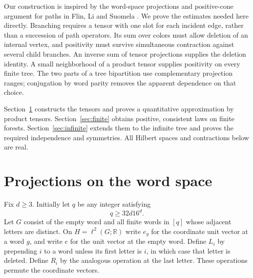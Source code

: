 \documentclass[11pt]{amsart}
\newcommand{\R}{\mathbb R}
\begin{document}
Our construction is inspired by the word-space projections and positive-cone
argument for paths in Flin, Li and Suomela \cite[Section 4.1 and Appendix B]{FLS}.
We prove the estimates needed here directly. Branching requires a tensor with
one slot for each incident edge, rather than a succession of path operators.
Its sum over colors must allow deletion of an internal vertex, and positivity
must survive simultaneous contraction against several child branches. An
inverse sum of tensor projections supplies the deletion identity. A small
neighborhood of a product tensor supplies positivity on every finite tree.
The two parts of a tree bipartition use complementary projection ranges;
conjugation by word parity removes the apparent dependence on that choice.

Section~\ref{sec:projections} constructs the tensors and proves a quantitative
approximation by product tensors. Section~\ref{sec:finite} obtains positive,
consistent laws on finite forests. Section~\ref{sec:infinite} extends them to
the infinite tree and proves the required independence and symmetries.
All Hilbert spaces and contractions below are real.

\section{Projections on the word space}\label{sec:projections}

Fix $d\geq3$. Initially let $q$ be any integer satisfying
\begin{equation}\label{eq:invertibilityrange}
q\geq32d16^d.
\end{equation}
Let $G$ consist of the empty word and all finite words in $[q]$ whose adjacent
letters are distinct. On $H=\ell^2(G;\R)$ write $e_g$ for the coordinate unit
vector at a word $g$, and write $e$ for the unit vector at the empty word.
Define $L_i$ by prepending $i$ to a word unless its first letter is $i$, in
which case that letter is deleted. Define $R_i$ by the analogous operation at
the last letter. These operations permute the coordinate vectors.
\end{document}

